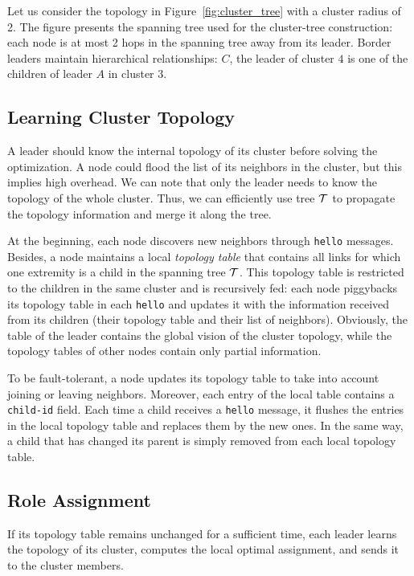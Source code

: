 \documentclass[twoside]{article}
\begin{document}
Let us consider the topology in Figure~\ref{fig:cluster_tree} with a
cluster radius of 2. The figure presents the spanning tree used for
the cluster-tree construction: each node is at most 2 hops in the
spanning tree away from its leader. Border leaders maintain hierarchical
relationships: $C$, the leader of cluster $4$ is one of the children
of leader $A$ in cluster $3$.






\subsection{Learning Cluster Topology}

A leader should know the internal topology of its cluster before
solving the \milp optimization. A node could flood the list of its
neighbors in the cluster, but this implies high overhead. We can note
that only the leader needs to know the topology of the whole
cluster. Thus, we can efficiently use tree $\mathcal{T}$ to propagate the
topology information and merge it along the tree.

At the beginning, each node discovers new neighbors through \texttt{hello} messages. Besides, a node maintains a local \emph{topology table} that contains
all links for which one extremity is a child in the
spanning tree $\mathcal{T}$. This topology table is restricted to the
children in the same cluster and is recursively fed: each node
piggybacks its topology table in each \texttt{hello} and
updates it with the information received from its children (their
topology table and their list of neighbors). Obviously, the
table of the leader contains the global vision of the cluster
topology, while the topology tables of other nodes contain only
partial information.

To be fault-tolerant, a node updates its topology table to take
into account joining or leaving neighbors. Moreover, each entry of the
local table contains a \texttt{child-id} field. Each time a child
receives a \texttt{hello} message, it flushes the entries in the local
topology table and replaces them by the new ones. In the same way, a
child that has changed its parent is simply removed from each local
topology table.


\subsection{Role Assignment}
\label{subsection-role-assignment}


If its topology table remains unchanged for a sufficient time, each leader learns the topology of its cluster, computes the local optimal assignment, and sends it to the cluster members.
\end{document}
